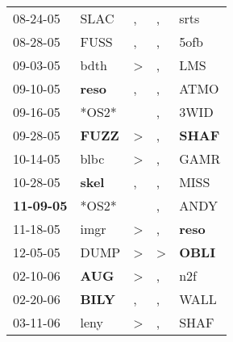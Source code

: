 \begin{supertabular}{p{0.07\textwidth}p{0.06\textwidth}p{0.02\textwidth}p{0.02\textwidth}p{0.06\textwidth}}
          08-24-05\textsuperscript{} &           SLAC\textsuperscript{} &                , &                , &           srts\textsuperscript{} \\
          08-28-05\textsuperscript{} &           FUSS\textsuperscript{} &                , &                , &           5ofb\textsuperscript{} \\
          09-03-05\textsuperscript{} &           bdth\textsuperscript{} &     \textgreater &                , &            LMS\textsuperscript{} \\
          09-10-05\textsuperscript{} &  \textbf{reso\textsuperscript{}} &                , &                , &           ATMO\textsuperscript{} \\
          09-16-05\textsuperscript{} &                            *OS2* &                  &                , &           3WID\textsuperscript{} \\
          09-28-05\textsuperscript{} &  \textbf{FUZZ\textsuperscript{}} &     \textgreater &                , &  \textbf{SHAF\textsuperscript{}} \\
          10-14-05\textsuperscript{} &           blbc\textsuperscript{} &     \textgreater &                , &           GAMR\textsuperscript{} \\
          10-28-05\textsuperscript{} &  \textbf{skel\textsuperscript{}} &                , &                , &           MISS\textsuperscript{} \\
 \textbf{11-09-05\textsuperscript{}} &                            *OS2* &                  &                , &           ANDY\textsuperscript{} \\
          11-18-05\textsuperscript{} &           imgr\textsuperscript{} &     \textgreater &                , &  \textbf{reso\textsuperscript{}} \\
          12-05-05\textsuperscript{} &           DUMP\textsuperscript{} &     \textgreater &     \textgreater &  \textbf{OBLI\textsuperscript{}} \\
          02-10-06\textsuperscript{} &   \textbf{AUG\textsuperscript{}} &     \textgreater &                , &            n2f\textsuperscript{} \\
          02-20-06\textsuperscript{} &  \textbf{BILY\textsuperscript{}} &                , &                , &           WALL\textsuperscript{} \\
          03-11-06\textsuperscript{} &           leny\textsuperscript{} &     \textgreater &                , &           SHAF\textsuperscript{} \\

\end{supertabular}
